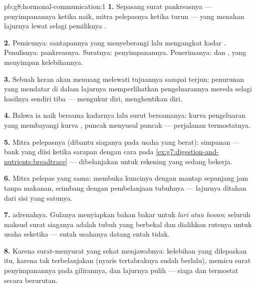 \begin{solution}{pb:g8:hormonal-communication:1}
\textbf{1.} Sepasang surat pankreasnya --- 
penyimpanannya ketika naik, mitra pelepasnya ketika turun
--- yang menahan lajurnya lewat  selagi
pemiliknya .

\textbf{2.} Pemicunya:  santapannya yang menyeberangi
 lalu mengangkat kadar . Penulisnya:
pankreasnya. Suratnya:  penyimpanannya. Penerimanya:
 dan , yang menyimpan kelebihannya.

\textbf{3.} Sebuah keran akan menuang melewati tujuannya
sampai terjun; penurunan yang mendatar di dalam lajurnya
memperlihatkan pengeluarannya mereda selagi hasilnya sendiri
tiba --- mengukur diri, menghentikan diri.

\textbf{4.} Bahwa ia naik bersama kadarnya lalu surut
bersamanya: kurva pengeluaran yang membayangi kurva
, puncak menyusul puncak --- perjalanan
termostatnya.

\textbf{5.} Mitra pelepasnya (dibantu  siaganya pada
usaha yang berat):  simpanan  --- bank yang
diisi ketika sarapan dengan cara pada
\cref{ex:g7:digestion-and-nutrients:breadtrace} ---
dibelanjakan untuk rekening  yang sedang bekerja.

\textbf{6.} Mitra pelepas yang sama: membuka kuncinya
dengan mantap sepanjang jam tanpa makanan, seimbang dengan
pembelanjaan tubuhnya --- lajurnya ditahan dari sisi yang
satunya.

\textbf{7.}  adrenalnya. Gulanya menyiapkan bahan
bakar untuk \emph{lari atau lawan}: seluruh maksud surat
siaganya adalah tubuh yang berbekal dan dialihkan rutenya
untuk usaha seketika --- entah usahanya datang entah tidak.

\textbf{8.} Karena surat-menyurat yang sehat menjawabnya:
kelebihan yang dilepaskan itu, karena tak terbelanjakan
(nyaris tertabraknya sudah berlalu), memicu surat
penyimpanannya pada gilirannya, dan lajurnya pulih ---
siaga dan termostat secara berurutan.


\end{solution}
